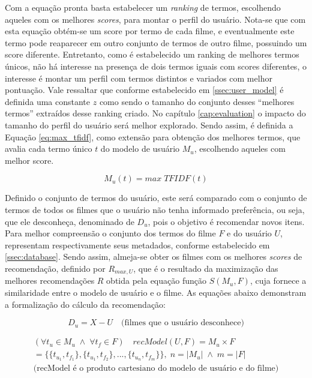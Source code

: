 Com a equação pronta basta estabelecer um \textit{ranking} de termos, escolhendo aqueles com os melhores \textit{scores}, para montar o perfil do usuário. Nota-se que com esta equação obtém-se um score por termo de cada filme, e eventualmente este termo pode reaparecer em outro conjunto de termos de outro filme, possuindo um score diferente. Entretanto, como é estabelecido um ranking de melhores termos únicos, não há interesse na presença de dois termos iguais com scores diferentes, o interesse é montar um perfil com termos distintos e variados com melhor pontuação. Vale ressaltar que conforme estabelecido em \ref{ssec:user_model} é definida uma constante $z$ como sendo o tamanho do conjunto desses \enquote{melhores termos} extraídos desse ranking criado. No capítulo \ref{cap:evaluation} o impacto do tamanho do perfil do usuário será melhor explorado.  Sendo assim, é definida a Equação \ref{eq:max_tfidf}, como extensão para obtenção dos melhores termos, que avalia cada termo único $t$ do modelo de usuário $M_u$, escolhendo aqueles com melhor score.

\begin{equation}
	M_u(t) = max \; TFIDF(t)
\label{eq:max_tfidf}
\end{equation}

Definido o conjunto de termos do usuário, este será comparado com o conjunto de termos de todos os filmes que o usuário não tenha informado preferência, ou seja, que ele desconheça, denominado de $D_u$, pois o objetivo é recomendar novos itens. Para melhor compreensão o conjunto dos termos do filme $F$ e do usuário $U$, representam respectivamente seus metadados, conforme estabelecido em \ref{ssec:database}. Sendo assim, almeja-se obter os filmes com os melhores \textit{scores} de recomendação, definido por $R_{max, U}$, que é o resultado da maximização das melhores recomendações $R$ obtida pela equação função $S(M_u, F)$, cuja fornece a similaridade entre o modelo de usuário e o filme. As equações abaixo demonstram a formalização do cálculo da recomendação:

\begin{equation}
	D_u = X - U \quad \text{(filmes que o usuário desconhece)}
\label{eq:rec_model_movies}
\end{equation}

\begin{equation}
	\begin{aligned}
		(\forall t_u \in M_u \;\land\; \forall t_f \in F) \quad recModel(U, F) = M_u \times F\\
		= \{\{t_{u_1}, t_{f_1}\}, \{t_{u_1}, t_{f_2}\}, ..., \{t_{u_n}, t_{f_m}\}\},\; n = |M_u| \;\land\; m = |F|\\
		\text{(recModel é o produto cartesiano do modelo de usuário e do filme)}
	\end{aligned}
\label{eq:rec_model_eq}
\end{equation}

